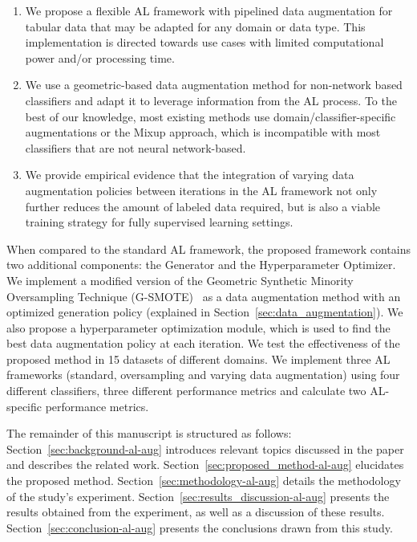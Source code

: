 \begin{enumerate}

    \item We propose a flexible AL framework with pipelined data
        augmentation for tabular data that may be adapted for any domain or
        data type. This implementation is directed towards use cases with
        limited computational power and/or processing time.

    \item We use a geometric-based data augmentation method for
        non-network based classifiers and adapt it to leverage information
        from the AL process. To the best of our knowledge, most
        existing methods use domain/classifier-specific augmentations or the
        Mixup approach, which is incompatible with most classifiers that are
        not neural network-based.

    \item We provide empirical evidence that the integration of varying data
        augmentation policies between iterations in the AL framework not only further
        reduces the amount of labeled data required, but is also a viable training
        strategy for fully supervised learning settings.

\end{enumerate}

When compared to the standard AL framework, the proposed framework contains
two additional components: the Generator and the Hyperparameter Optimizer. We
implement a modified version of the Geometric Synthetic Minority Oversampling
Technique (G-SMOTE)~\cite{Douzas2019} as a data augmentation method with an
optimized generation policy (explained in
Section~\ref{sec:data_augmentation}). We also propose a hyperparameter
optimization module, which is used to find the best data augmentation policy
at each iteration. We test the effectiveness of the proposed method in 15
datasets of different domains. We implement three AL frameworks (standard,
oversampling and varying data augmentation) using four different classifiers,
three different performance metrics and calculate two AL-specific performance
metrics. 

The remainder of this manuscript is structured as follows:
Section~\ref{sec:background-al-aug} introduces relevant topics discussed in the paper
and describes the related work. Section~\ref{sec:proposed_method-al-aug} elucidates
the proposed method. Section~\ref{sec:methodology-al-aug} details the methodology of
the study's experiment. Section~\ref{sec:results_discussion-al-aug} presents the
results obtained from the experiment, as well as a discussion of these
results. Section~\ref{sec:conclusion-al-aug} presents the conclusions drawn from
this study.
 
